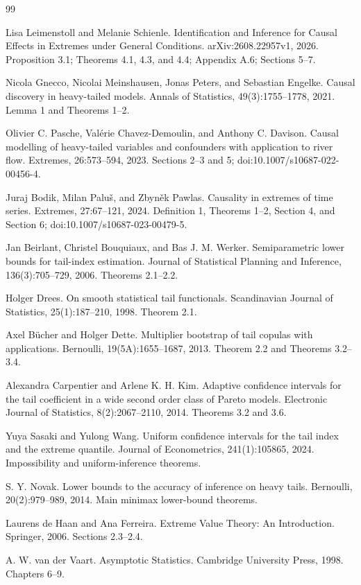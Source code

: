 \documentclass{article}
\begin{document}
\begin{thebibliography}{99}

   Lisa Leimenstoll and Melanie Schienle. Identification and Inference for Causal Effects in Extremes under General Conditions. arXiv:2608.22957v1, 2026. Proposition 3.1; Theorems 4.1, 4.3, and 4.4; Appendix A.6; Sections 5--7.

   Nicola Gnecco, Nicolai Meinshausen, Jonas Peters, and Sebastian Engelke. Causal discovery in heavy-tailed models. Annals of Statistics, 49(3):1755--1778, 2021. Lemma 1 and Theorems 1--2.

   Olivier C. Pasche, Valérie Chavez-Demoulin, and Anthony C. Davison. Causal modelling of heavy-tailed variables and confounders with application to river flow. Extremes, 26:573--594, 2023. Sections 2--3 and 5; doi:10.1007/s10687-022-00456-4.

   Juraj Bodik, Milan Paluš, and Zbyněk Pawlas. Causality in extremes of time series. Extremes, 27:67--121, 2024. Definition 1, Theorems 1--2, Section 4, and Section 6; doi:10.1007/s10687-023-00479-5.

   Jan Beirlant, Christel Bouquiaux, and Bas J. M. Werker. Semiparametric lower bounds for tail-index estimation. Journal of Statistical Planning and Inference, 136(3):705--729, 2006. Theorems 2.1--2.2.

   Holger Drees. On smooth statistical tail functionals. Scandinavian Journal of Statistics, 25(1):187--210, 1998. Theorem 2.1.

   Axel B\"ucher and Holger Dette. Multiplier bootstrap of tail copulas with applications. Bernoulli, 19(5A):1655--1687, 2013. Theorem 2.2 and Theorems 3.2--3.4.

   Alexandra Carpentier and Arlene K. H. Kim. Adaptive confidence intervals for the tail coefficient in a wide second order class of Pareto models. Electronic Journal of Statistics, 8(2):2067--2110, 2014. Theorems 3.2 and 3.6.

   Yuya Sasaki and Yulong Wang. Uniform confidence intervals for the tail index and the extreme quantile. Journal of Econometrics, 241(1):105865, 2024. Impossibility and uniform-inference theorems.

   S. Y. Novak. Lower bounds to the accuracy of inference on heavy tails. Bernoulli, 20(2):979--989, 2014. Main minimax lower-bound theorems.

   Laurens de Haan and Ana Ferreira. Extreme Value Theory: An Introduction. Springer, 2006. Sections 2.3--2.4.

   A. W. van der Vaart. Asymptotic Statistics. Cambridge University Press, 1998. Chapters 6--9.

\end{thebibliography}
\end{document}
